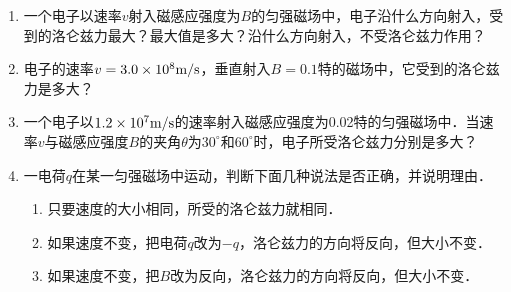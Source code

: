 \begin{enumerate}
    \begin{solution}
    
    \end{solution}
    
    \item 一个电子以速率$v$射入磁感应强度为$B$的匀强磁场中，电子沿什么方向射入，受到的洛仑兹力最大？最大值是多大？沿什么方向射入，不受洛仑兹力作用？


    \begin{solution}
    
    \end{solution}
    
    \item 电子的速率$v=3.0\times10^8\text{m}/\text{s}$，垂直射入$B=0.1$特的磁场中，它受到的洛仑兹力是多大？


    \begin{solution}
    
    \end{solution}
    
    \item 一个电子以$1.2\times10^7\text{m}/\text{s}$的速率射入磁感应强度为0.02特的匀强磁场中．当速率$v$与磁感应强度$B$的夹角$\theta$为$30^{\circ}$和$60^{\circ}$时，电子所受洛仑兹力分别是多大？


    \begin{solution}
    
    \end{solution}
    
    \item 一电荷$q$在某一匀强磁场中运动，判断下面几种说法是否正确，并说明理由．
\begin{enumerate}
    \item 只要速度的大小相同，所受的洛仑兹力就相同．
    \item 如果速度不变，把电荷$q$改为$-q$，洛仑兹力的方向将反向，但大小不变．
    \item 如果速度不变，把$B$改为反向，洛仑兹力的方向将反向，但大小不变．
\end{enumerate}



\begin{solution}

\end{solution}

\end{enumerate}



 
